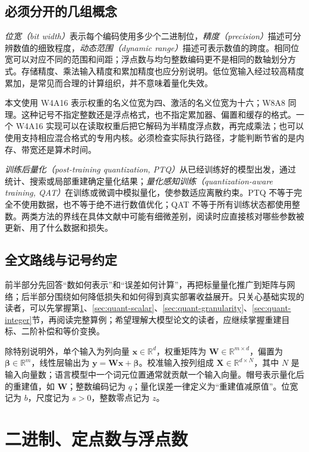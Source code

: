 \documentclass[UTF8,12pt,a4paper,fontset=fandol]{ctexart}
\begin{document}
\subsection{必须分开的几组概念}
\emph{位宽（bit width）}表示每个编码使用多少个二进制位，\emph{精度（precision）}描述可分辨数值的细致程度，\emph{动态范围（dynamic range）}描述可表示数值的跨度。相同位宽可以对应不同的范围和间距；浮点数与均匀整数编码更不是相同的数轴划分方式。存储精度、乘法输入精度和累加精度也应分别说明。低位宽输入经过较高精度累加，是常见而合理的计算组织，并不意味着量化失效。

本文使用 W4A16 表示权重的名义位宽为四、激活的名义位宽为十六；W8A8 同理。这种记号不指定整数还是浮点格式，也不指定累加器、偏置和缓存的格式。一个 W4A16 实现可以在读取权重后把它解码为半精度浮点数，再完成乘法；也可以使用支持相应混合格式的专用内核。必须检查实际执行路径，才能判断节省的是内存、带宽还是算术时间。

\emph{训练后量化（post-training quantization, PTQ）}从已经训练好的模型出发，通过统计、搜索或局部重建确定量化结果；\emph{量化感知训练（quantization-aware training, QAT）}在训练或微调中模拟量化，使参数适应离散约束。PTQ 不等于完全不使用数据，也不等于绝不进行数值优化；QAT 不等于所有训练状态都使用整数。两类方法的界线在具体文献中可能有细微差别，阅读时应直接核对哪些参数被更新、用了什么数据和损失。

\subsection{全文路线与记号约定}
前半部分先回答“数如何表示”和“误差如何计算”，再把标量量化推广到矩阵与网络；后半部分围绕如何降低损失和如何得到真实部署收益展开。只关心基础实现的读者，可以先掌握第\ref{sec:quant-number}、\ref{sec:quant-scalar}、\ref{sec:quant-granularity}、\ref{sec:quant-integer}节，再阅读完整算例；希望理解大模型论文的读者，应继续掌握重建目标、二阶补偿和等价变换。

除特别说明外，单个输入为列向量 $\mathbf x\in\mathbb R^d$，权重矩阵为 $\mathbf W\in\mathbb R^{m\times d}$，偏置为 $\boldsymbol\beta\in\mathbb R^m$，线性层输出为 $\mathbf y=\mathbf W\mathbf x+\boldsymbol\beta$。校准输入按列组成 $\mathbf X\in\mathbb R^{d\times N}$，其中 $N$ 是输入向量数；语言模型中一个词元位置通常就贡献一个输入向量。帽号表示量化后的重建值，如 $\widehat{\mathbf W}$；整数编码记为 $q$；量化误差一律定义为“重建值减原值”。位宽记为 $b$，尺度记为 $s>0$，整数零点记为 $z$。

\section{二进制、定点数与浮点数}
\label{sec:quant-number}
\end{document}
